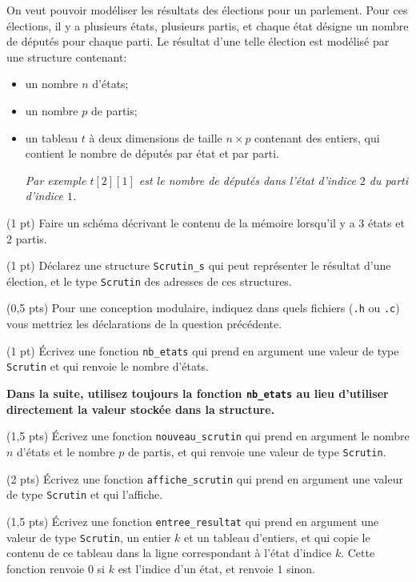 On veut pouvoir modéliser les résultats des élections pour un
parlement. Pour ces élections, il y a plusieurs états, plusieurs
partis, et chaque état désigne un nombre de députés pour chaque
parti. Le résultat d'une telle élection est modélisé par une structure
contenant:
\begin{itemize}
\item un nombre \(n\) d'états;
\item un nombre \(p\) de partis;
\item un tableau \(t\) à deux dimensions de taille \(n\times p\)
  contenant des entiers, qui contient le nombre de députés par état et
  par parti.
  \begin{center}
    \em Par exemple \(t[2][1]\) est le nombre de députés dans l'état
    d'indice \(2\) du parti d'indice \(1\).
  \end{center}
\end{itemize}

\question (1 pt) Faire un schéma décrivant le contenu de la mémoire 
lorsqu'il y a 3 états et 2 partis.

\question (1 pt) Déclarez une structure \texttt{Scrutin\_s} qui peut
représenter le résultat d'une élection, et le type \texttt{Scrutin} des adresses de
ces structures.

\question (0,5 pts) Pour une conception modulaire, indiquez dans quels
fichiers (\texttt{.h} ou \texttt{.c}) vous mettriez les déclarations
de la question précédente.

\question (1 pt) Écrivez une fonction \texttt{nb\_etats} qui prend
en argument une valeur de type \texttt{Scrutin} et qui renvoie le
nombre d'états.

\vspace*{1ex} {\bf Dans la suite, utilisez toujours la fonction
  \texttt{nb\_etats} au lieu d'utiliser directement la valeur stockée
  dans la structure.}

\question (1,5 pts) Écrivez une fonction \texttt{nouveau\_scrutin} qui
prend en argument le nombre \(n\) d'états et le nombre \(p\) de
partis, et qui renvoie une valeur de type \texttt{Scrutin}.

\question (2 pts) Écrivez une fonction \texttt{affiche\_scrutin} qui
prend en argument une valeur de type \texttt{Scrutin} et qui l'affiche.

\question (1,5 pts) Écrivez une fonction \texttt{entree\_resultat} qui
prend en argument une valeur de type \texttt{Scrutin}, un entier \(k\)
et un tableau d'entiers, et qui copie le contenu de ce tableau dans la
ligne correspondant à l'état d'indice \(k\). Cette fonction renvoie
\(0\) si \(k\) est l'indice d'un état, et renvoie \(1\) sinon.

